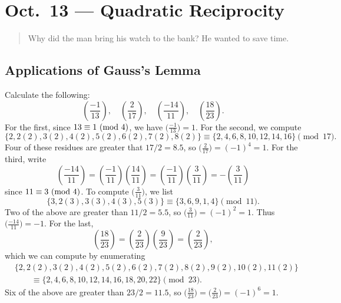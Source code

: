 \chapter{Oct.~13 --- Quadratic Reciprocity}

\begin{quote}
  \begin{emph}
    Why did the man bring his watch to the
    bank? He wanted to save time.
  \end{emph}
\end{quote}

\section{Applications of Gauss's Lemma}

\begin{exercise}
  Calculate the following:
  \[
    \left(\frac{-1}{13}\right), \quad
    \left(\frac{2}{17}\right), \quad
    \left(\frac{-14}{11}\right), \quad
    \left(\frac{18}{23}\right).
  \]
  For the first, since
  $13 \equiv 1 \ (\mathrm{mod}\ 4)$, we have
  $\big(\frac{-1}{13}\big) = 1$.
  For the second, we compute
  \[
    \{2, 2(2), 3(2), 4(2), 5(2), 6(2), 7(2), 8(2)\}
    \equiv \{2, 4, 6, 8, 10, 12, 14, 16\}
    \pmod{17}.
  \]
  Four of these residues are
  greater that $17 / 2 = 8.5$, so
  $\big(\frac{2}{17}\big) = (-1)^4 = 1$.
  For the third, write
  \[
    \left(\frac{-14}{11}\right)
    = \left(\frac{-1}{11}\right)
    \left(\frac{14}{11}\right)
    = \left(\frac{-1}{11}\right)
    \left(\frac{3}{11}\right)
    = -\left(\frac{3}{11}\right)
  \]
  since $11 \equiv 3 \ (\mathrm{mod}\ 4)$.
  To compute $\big(\frac{3}{11}\big)$,
  we list
  \[
    \{3, 2(3), 3(3), 4(3), 5(3)\}
    \equiv \{3, 6, 9, 1, 4\}
    \pmod{11}.
  \]
  Two of the above are greater than $11 / 2 = 5.5$,
  so $\big(\frac{3}{11}\big) = (-1)^2 = 1$.
  Thus $\big(\frac{-14}{11}\big) = -1$.
  For the last,
  \[
    \left(\frac{18}{23}\right)
    = \left(\frac{2}{23}\right)
    \left(\frac{9}{23}\right)
    = \left(\frac{2}{23}\right),
  \]
  which we can compute by enumerating
  \begin{align*}
    &\{2, 2(2), 3(2), 4(2), 5(2), 6(2), 7(2), 8(2), 9(2), 10(2), 11(2)\} \\
    &\quad \quad \equiv \{2, 4, 6, 8, 10, 12, 14, 16, 18, 20, 22\}
    \pmod{23}.
  \end{align*}
  Six of the above are greater than
  $23 / 2 = 11.5$, so
  $\big(\frac{18}{23}\big) = \big(\frac{2}{23}\big) = (-1)^6 = 1$.
\end{exercise}

